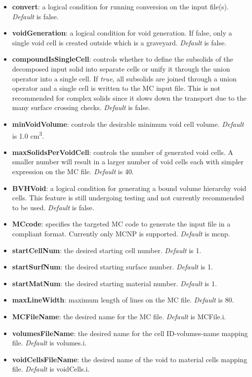 \documentclass[12pt, a4paper, titlepage]{article}
\begin{document}
	\begin{itemize}
	  \item \textbf{convert}: a logical condition for running conversion on the input file(s). \emph{Default} is false.
	  \item \textbf{voidGeneration}: a logical condition for void generation. If false, only a single void cell is created outside which is a graveyard. \emph{Default} is false.
	  \item \textbf{compoundIsSingleCell}: controls whether to define the subsolids of the decomposed input solid into separate cells or unify it through the union operator into a single cell. If \emph{true}, all subsolids are joined  through a union operator and a single cell is written to the MC input file. This is not recommended for complex solids since it slows down the transport due to the many surface crossing checks. \emph{Default} is false.
	  \item \textbf{minVoidVolume}: controls the desirable minimum void cell volume. \emph{Default} is 1.0 cm\textsuperscript{3}.
	  \item \textbf{maxSolidsPerVoidCell}: controls the number of generated void cells. A smaller number will result in a larger number of void cells each with simpler expression on the MC file. \emph{Default} is 40.
	  \item \textbf{BVHVoid}: a logical condition for generating a bound volume hierarchy void cells. This feature is still undergoing testing and not currently recommended to be used. \emph{Default} is false.
	  \item \textbf{MCcode}: specifies the targeted MC code to generate the input file in a compliant format. Currently only MCNP is supported. \emph{Default} is mcnp.
	  \item \textbf{startCellNum}: the desired starting cell number. \emph{Default} is 1.
	  \item \textbf{startSurfNum}: the desired starting surface number. \emph{Default} is 1.
	  \item \textbf{startMatNum}: the desired starting material number. \emph{Default} is 1.
	  \item \textbf{maxLineWidth}: maximum length of lines on the MC file. \emph{Default} is 80.
	  \item \textbf{MCFileName}: the desired name for the MC file. \emph{Default} is MCFile.i.
	  \item \textbf{volumesFileName}: the desired name for the cell ID-volumes-name mapping file. \emph{Default} is volumes.i.
	  \item \textbf{voidCellsFileName}: the desired name of the void to material cells mapping file. \emph{Default} is voidCells.i.
    \end{itemize}
\end{document}
